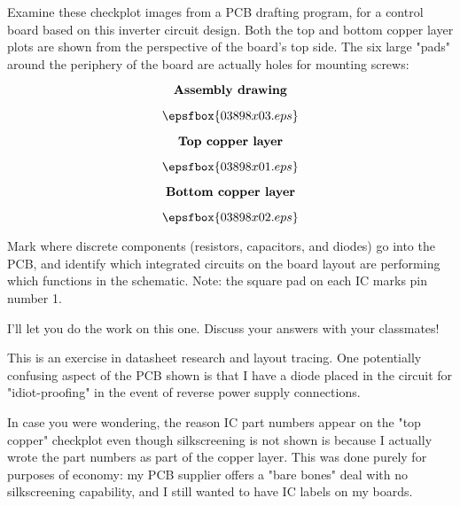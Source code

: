 

Examine these checkplot images from a PCB drafting program, for a control board based on this inverter circuit design.  Both the top and bottom copper layer plots are shown from the perspective of the board's top side.  The six large "pads" around the periphery of the board are actually holes for mounting screws:

\vskip 10pt

$$\hbox{\bf Assembly drawing}$$

$$\epsfbox{03898x03.eps}$$

\vfil \eject

$$\hbox{\bf Top copper layer}$$

$$\epsfbox{03898x01.eps}$$

\vfil \eject

$$\hbox{\bf Bottom copper layer}$$

$$\epsfbox{03898x02.eps}$$


\vskip 10pt

Mark where discrete components (resistors, capacitors, and diodes) go into the PCB, and identify which integrated circuits on the board layout are performing which functions in the schematic.  Note: the square pad on each IC marks pin number 1.







I'll let you do the work on this one.  Discuss your answers with your classmates!







This is an exercise in datasheet research and layout tracing.  One potentially confusing aspect of the PCB shown is that I have a diode placed in the circuit for "idiot-proofing" in the event of reverse power supply connections.

In case you were wondering, the reason IC part numbers appear on the "top copper" checkplot even though silkscreening is not shown is because I actually wrote the part numbers as part of the copper layer.  This was done purely for purposes of economy: my PCB supplier offers a "bare bones" deal with no silkscreening capability, and I still wanted to have IC labels on my boards.



